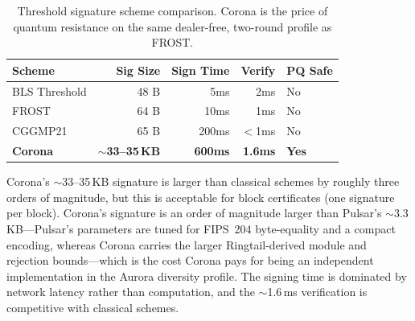 \begin{table}[h]
\centering
\begin{tabular}{@{}lrrrl@{}}
\toprule
\textbf{Scheme} & \textbf{Sig Size} & \textbf{Sign Time} & \textbf{Verify} & \textbf{PQ Safe} \\
\midrule
BLS Threshold & 48 B & 5ms & 2ms & No \\
FROST & 64 B & 10ms & 1ms & No \\
CGGMP21 & 65 B & 200ms & $<$1ms & No \\
\textbf{Corona} & \textbf{$\sim$33--35\,KB} & \textbf{600ms} & \textbf{1.6ms} & \textbf{Yes} \\
\bottomrule
\end{tabular}
\caption{Threshold signature scheme comparison. Corona is the price of quantum resistance
on the same dealer-free, two-round profile as FROST.}
\label{tab:comparison}
\end{table}

Corona's $\sim$33--35\,KB signature is larger than classical schemes by roughly three
orders of magnitude, but this is acceptable for block certificates (one signature per
block). Corona's signature is an order of magnitude larger than Pulsar's
$\sim$3.3\,KB---Pulsar's parameters are tuned for FIPS~204 byte-equality and a compact
encoding, whereas Corona carries the larger Ringtail-derived module and rejection
bounds---which is the cost Corona pays for being an independent implementation in the
Aurora diversity profile. The signing time is dominated by network latency rather than
computation, and the $\sim$1.6\,ms verification is competitive with classical schemes.

